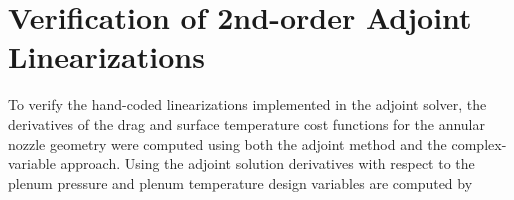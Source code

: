 \section{Verification of 2nd-order Adjoint Linearizations}

To verify the hand-coded linearizations implemented in the adjoint solver, the
derivatives of the drag and surface temperature cost functions for the
annular nozzle geometry were computed using both the adjoint method and the
complex-variable approach. Using the adjoint solution derivatives with respect
to the plenum pressure and plenum temperature design variables are computed
by 

